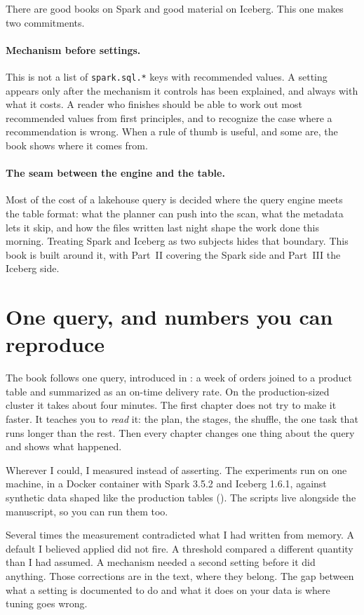 There are good books on Spark and good material on Iceberg. This one makes two
commitments.

\paragraph{Mechanism before settings.} This is not a list of
\texttt{spark.sql.*} keys with recommended values. A setting appears only after the
mechanism it controls has been explained, and always with what it costs. A reader
who finishes should be able to work out most recommended values from first
principles, and to recognize the case where a recommendation is wrong. When a rule
of thumb is useful, and some are, the book shows where it comes from.

\paragraph{The seam between the engine and the table.} Most of the cost of a
lakehouse query is decided where the query engine meets the table format: what the
planner can push into the scan, what the metadata lets it skip, and how the files
written last night shape the work done this morning. Treating Spark and Iceberg as
two subjects hides that boundary. This book is built around it, with Part~II
covering the Spark side and Part~III the Iceberg side.

\section*{One query, and numbers you can reproduce}

The book follows one query, introduced in : a week of orders joined
to a product table and summarized as an on-time delivery rate. On the
production-sized cluster it takes about four minutes. The first chapter does not
try to make it faster. It teaches you to \emph{read} it: the plan, the stages, the
shuffle, the one task that runs longer than the rest. Then every chapter changes
one thing about the query and shows what happened.

Wherever I could, I measured instead of asserting. The experiments run on one
machine, in a Docker container with Spark 3.5.2 and Iceberg 1.6.1, against
synthetic data shaped like the production tables (). The
scripts live alongside the manuscript, so you can run them too.

Several times the measurement contradicted what I had written from memory. A
default I believed applied did not fire. A threshold compared a different quantity
than I had assumed. A mechanism needed a second setting before it did anything.
Those corrections are in the text, where they belong. The gap between what a
setting is documented to do and what it does on your data is where tuning goes
wrong.

